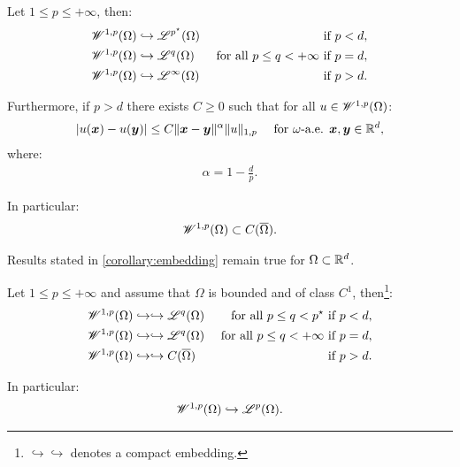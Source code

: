 \begin{corollary}
    Let $1 \leq p \leq +\infty$, then:
    \begin{align}
        \mathscr{W}^{1, p}(\Omega) & \hookrightarrow \mathscr{L}^{p^{\star}}(\Omega) & \text{ if } p < d, \\
        \mathscr{W}^{1, p}(\Omega) & \hookrightarrow \mathscr{L}^{q}(\Omega) &\text{ for all } p \leq q < +\infty \text{ if } p = d, \\
        \mathscr{W}^{1, p}(\Omega) & \hookrightarrow \mathscr{L}^{\infty}(\Omega) & \text{ if } p > d.
    \end{align}

    Furthermore, if $p > d$ there exists $C \geq 0$ such that for all $u \in \mathscr{W}^{1, p}(\Omega)$:
    \begin{align}
        \lvert u(\bm{x}) - u(\bm{y}) \rvert &\leq C \lVert \bm{x} - \bm{y} \rVert^{\alpha} \lVert u \rVert_{1, p} &\text{ for } \omega \text{-a.e. } \bm{x}, \bm{y} \in \mathbb{R}^{d},
    \end{align}
    where:
    \begin{align}
        \alpha = 1 - \frac{d}{p}.
    \end{align}

    In particular:
    \begin{align}
        \mathscr{W}^{1, p}(\Omega) \subset C(\overline{\Omega}).
    \end{align}
\end{corollary}

\begin{corollary}
    Results stated in \cref{corollary:embedding} remain true for $\Omega \subset \mathbb{R}^{d}$.
\end{corollary}

\begin{theorem}
    Let $1 \leq p \leq +\infty$ and assume that $\Omega$ is bounded and of class $C^1$, then\footnote{$\hookrightarrow \hookrightarrow$ denotes a compact embedding.}:
    \begin{align}
        \mathscr{W}^{1, p}(\Omega) & \hookrightarrow \hookrightarrow \mathscr{L}^{q}(\Omega) &\text{ for all } p \leq q < p^{\star} \text{ if } p < d, \\
        \mathscr{W}^{1, p}(\Omega) & \hookrightarrow \hookrightarrow \mathscr{L}^{q}(\Omega) &\text{ for all } p \leq q < +\infty \text{ if } p = d, \\
        \mathscr{W}^{1, p}(\Omega) & \hookrightarrow \hookrightarrow C(\overline{\Omega}) & \text{ if } p > d.
    \end{align}

    In particular:
    \begin{align}
        \mathscr{W}^{1, p}(\Omega) \hookrightarrow \mathscr{L}^{p}(\Omega).
    \end{align}
\end{theorem}

